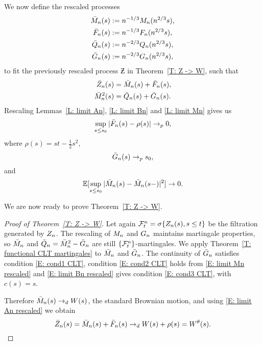 We now define the rescaled processes 
\begin{equation}
\begin{aligned}
\bar{M}_n(s) &:= n^{-1 / 3}M_n(n^{2 / 3}s), \\
\bar{F}_n(s) &:= n^{-1 / 3}F_n(n^{2 / 3}s), \\
\bar{Q}_n(s) &:= n^{-2 / 3}Q_n(n^{2 / 3}s), \\
\bar{G}_n(s) &:= n^{-2 / 3}G_n(n^{2 / 3}s),
\end{aligned} 	
\end{equation}
to fit the previously rescaled process 
$\Zbar$ in Theorem~\ref{T: Z -> W}, such that
\begin{equation}
\begin{aligned}
\bar{Z}_n(s) &= \bar{M}_n(s) + \bar{F}_n(s), \\
\bar{M}_n^2(s) &= \bar{Q}_n(s) + \bar{G}_n(s).
\end{aligned}	
\end{equation}
Rescaling Lemmas~\ref{L: limit An}, \ref{L: limit Bn} and \ref{L: limit Mn} gives us
\begin{equation} \label{E: limit An rescaled}
\sup_{s \leq s_0} |\bar{F}_n(s) - \rho (s)| \rightarrow_p 0,
\end{equation}
where $\rho (s) = st - \frac{1}{2}s^2$,
\begin{equation} \label{E: limit Bn rescaled}
\bar{G}_n(s) \rightarrow_p s_0,
\end{equation}
and
\begin{equation} \label{E: limit Mn rescaled}
\mathbb{E}[\sup_{s \leq s_0} | \bar{M}_n(s) - \bar{M}_n(s-) |^2 ] \rightarrow 0.
\end{equation}

We are now ready to prove Theorem~\ref{T: Z -> W}.

\begin{proof}[Proof of Theorem~\ref{T: Z -> W}]
	Let again $\mathcal{F}^n_{t} = \sigma \{ Z_n(s), s \leq t \}$ be the filtration generated by $Z_n$.
	The rescaling of $M_n$ and $G_n$ maintains martingale properties,
	so $\bar{M}_n$ and $\bar{Q}_n = \bar{M}_n^2 - \bar{G}_n$ are still $\{\mathcal{F}^n_{t}\}$-martingales.
	We apply Theorem~\ref{T: functional CLT martingales} to $\bar{M}_n$ and $\bar{G}_n$.
	The continuity of $\bar{G}_n$ satisfies condition \eqref{E: cond1 CLT}, 
	condition \eqref{E: cond2 CLT} holds from \eqref{E: limit Mn rescaled}
	and \eqref{E: limit Bn rescaled} gives condition \eqref{E: cond3 CLT}, with $c(s) = s$.
	
	Therefore $\bar{M}_n(s) \rightarrow_d W(s)$, the standard Brownian motion, and using \eqref{E: limit An rescaled} we obtain
	\begin{equation}
	\bar{Z}_n(s) = \bar{M}_n(s) + \bar{F}_n(s) \rightarrow_d W(s) + \rho (s) = W^{\theta}(s).
	\end{equation}
\end{proof}



